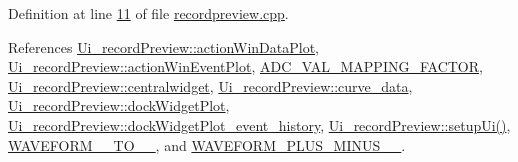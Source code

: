 Definition at line \hyperlink{a00042_source_l00011}{11} of file \hyperlink{a00042_source}{recordpreview.\+cpp}.



References \hyperlink{a00053_source_l00034}{Ui\+\_\+record\+Preview\+::action\+Win\+Data\+Plot}, \hyperlink{a00053_source_l00039}{Ui\+\_\+record\+Preview\+::action\+Win\+Event\+Plot}, \hyperlink{a00031_source_l00075}{A\+D\+C\+\_\+\+V\+A\+L\+\_\+\+M\+A\+P\+P\+I\+N\+G\+\_\+\+F\+A\+C\+T\+O\+R}, \hyperlink{a00053_source_l00040}{Ui\+\_\+record\+Preview\+::centralwidget}, \hyperlink{a00053_source_l00057}{Ui\+\_\+record\+Preview\+::curve\+\_\+data}, \hyperlink{a00053_source_l00053}{Ui\+\_\+record\+Preview\+::dock\+Widget\+Plot}, \hyperlink{a00053_source_l00041}{Ui\+\_\+record\+Preview\+::dock\+Widget\+Plot\+\_\+event\+\_\+history}, \hyperlink{a00053_source_l00060}{Ui\+\_\+record\+Preview\+::setup\+Ui()}, \hyperlink{a00034_source_l00039}{W\+A\+V\+E\+F\+O\+R\+M\+\_\+\_\+\+T\+O\+\_\+\_}, and \hyperlink{a00034_source_l00040}{W\+A\+V\+E\+F\+O\+R\+M\+\_\+\+P\+L\+U\+S\+\_\+\+M\+I\+N\+U\+S\+\_\+\_}.


